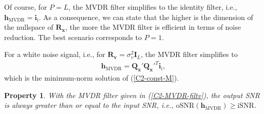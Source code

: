 \documentclass[10pt,pdflatex,headrule,landscape]{beamer}
\newtheorem{property}{Property}[section]
\begin{document}
\begin{frame}[allowframebreaks]
Of course, for $P=L$, the MVDR filter simplifies to the identity filter, i.e., $\mathbf{h}_{\mathrm{MVDR}}=\mathbf{i}_{\mathrm{i}}$. As a consequence, we can state that the higher is the dimension of the nullspace of $\mathbf{R}_{\mathbf{x}}$, the more the MVDR filter is efficient in terms of noise reduction. The best scenario corresponds to $P=1$.

For a white noise signal, i.e., for $\mathbf{R}_{\mathbf{v}} = \sigma_v^2 \mathbf{I}_L$, the MVDR filter simplifies to
\begin{eqnarray}
\label{C2-MVDR-filtv-wn}
 \mathbf{h}_{\mathrm{MVDR}} = \mathbf{Q}_{\mathbf{x}}' \mathbf{Q}_{\mathbf{x}}'^T \mathbf{i}_{\mathrm{i}} ,
\end{eqnarray}
which is the minimum-norm solution of (\ref{C2-const-M}).

\begin{property}
With the MVDR filter given in (\ref{C2-MVDR-filtv}), the output SNR is always greater than or equal to the input SNR, i.e., $\mathrm{oSNR}\left(\mathbf{h}_{\mathrm{MVDR}} \right) \geq \mathrm{iSNR}$.
\end{property}

\end{frame}
\end{document}
